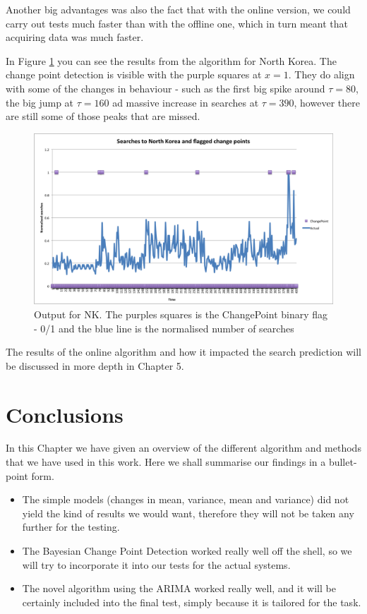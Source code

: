 \documentclass[minf,twoside,singlespacing,parskip,frontabs,notimes,12pt]{infthesis} %
\begin{document}
Another big advantages was also the fact that with the online version, we could carry out tests much faster than with the offline one, which in turn meant that acquiring data was much faster. 

In Figure \ref{NK} you can see the results from the algorithm for North Korea. The change point detection is visible with the purple squares at $x=1$. They do align with some of the changes in behaviour - such as the first big spike around $\tau = 80$, the big jump at $\tau = 160$ ad massive increase in searches at $\tau = 390$, however there are still some of those peaks that are missed. 

\begin{figure}[h!]
\begin{center}
\includegraphics[width=\textwidth]{NK}
\end{center}
\caption{Output for NK. The purples squares is the ChangePoint binary flag - 0/1 and the blue line is the normalised number of searches}
\label{NK}
\end{figure}


The results of the online algorithm and how it impacted the search prediction will be discussed in more depth in Chapter 5. 

\newpage
\section{Conclusions}

In this Chapter we have given an overview of the different algorithm and methods that we have used in this work. Here we shall summarise our findings in a bullet-point form.

\begin{itemize}
\item The simple models (changes in mean, variance, mean and variance) did not yield the kind of results we would want, therefore they will not be taken any further for the testing. 
\item The Bayesian Change Point Detection worked really well off the shell, so we will try to incorporate it into our tests for the actual systems. 
\item The novel algorithm using the ARIMA worked really well, and it will be certainly included into the final test, simply because it is tailored for the task. 
\end{itemize}
\end{document}
